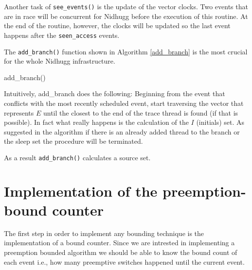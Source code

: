 Another task of \verb|see_events()| is the update of the vector clocks. Two events that are in race will be concurrent for Nidhugg before the execution
of this routine. At the end of the routine, however, the clocks will be updated so the last event happens after the \verb|seen_access| events.

The \verb|add_branch()| function shown in Algorithm \ref{add_branch} is the most crucial for the whole Nidhugg infrastructure.

\begin{algorithm}
    \caption{add\_branch()}
    \label{add_branch}
\end{algorithm}

Intuitively, add\_branch does the following: Beginning from the event that conflicts with the most recently scheduled event, start traversing
the vector that represents $E$ until the closest to the end of the trace thread is found (if that is possible). In fact what really happens is the 
calculation of the
$I$ (initials) set. As suggested in the algorithm if there is an already added thread to the branch or the sleep set the procedure will be terminated.

As a result \verb|add_branch()| calculates a source set.

\section{Implementation of the preemption-bound counter}

The first step in order to implement any bounding technique is the implementation of a bound counter. Since we are intrested in implementing
a preemption bounded algorithm we should be able to know the bound count of each event i.e., how many preemptive switches happened until the current 
event. 

